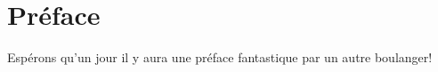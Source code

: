 \chapter{Préface}%
\label{ch:Foreword}
Espérons qu'un jour il y aura une préface fantastique
par un autre boulanger!